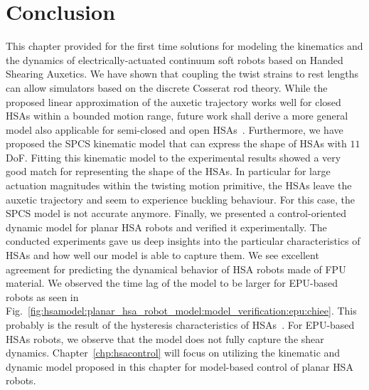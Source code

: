 \section{Conclusion}\label{sec:hsamodel:conclusion}
%
This chapter provided for the first time solutions for modeling the kinematics and the dynamics of electrically-actuated continuum soft robots based on Handed Shearing Auxetics.
%
We have shown that coupling the twist strains to rest lengths can allow simulators based on the discrete Cosserat rod theory. %
While the proposed linear approximation of the auxetic trajectory works well for closed \glspl{HSA} within a bounded motion range, future work shall derive a more general model also applicable for semi-closed and open \glspl{HSA}~\cite{good2022expanding}.
Furthermore, we have proposed the \gls{SPCS} kinematic model that can express the shape of \glspl{HSA} with $11$ DoF.
Fitting this kinematic model to the experimental results showed a very good match for representing the shape of the \glspl{HSA}. In particular for large actuation magnitudes within the twisting motion primitive, the \glspl{HSA} leave the auxetic trajectory and seem to experience buckling behaviour. For this case, the \gls{SPCS} model is not accurate anymore.
Finally, we presented a control-oriented dynamic model for planar \gls{HSA} robots and verified it experimentally.
The conducted experiments gave us deep insights into the particular characteristics of \glspl{HSA} and how well our model is able to capture them. We see excellent agreement for predicting the dynamical behavior of \gls{HSA} robots made of FPU material.
We observed the time lag of the model to be larger for EPU-based robots as seen in Fig.~\ref{fig:hsamodel:planar_hsa_robot_model:model_verification:epu:chiee}. This probably is the result of the hysteresis characteristics of \glspl{HSA}~\cite{good2022expanding}.
For EPU-based \glspl{HSA} robots, we observe that the model does not fully capture the shear dynamics.
Chapter~\ref{chp:hsacontrol} will focus on utilizing the kinematic and dynamic model proposed in this chapter for model-based control of planar \gls{HSA} robots.